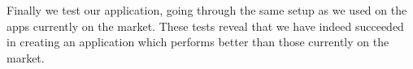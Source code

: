 \bigskip \noindent
Finally we test our application, going through the same setup as we used on the apps currently on the market.
These tests reveal that we have indeed succeeded in creating an application which performs better than those currently on the market.

%
%
%
%
%
%
%
%
%
%
